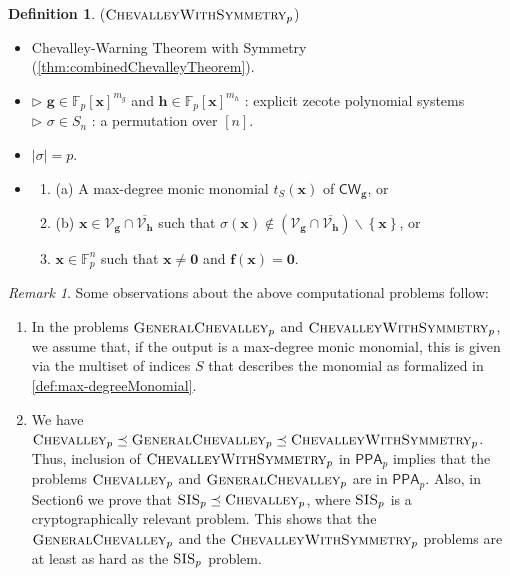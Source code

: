 \documentclass[10pt,a4paper]{article}
\theoremstyle{definition}
\newtheorem{definition}[theorem]{Definition}
\theoremstyle{remark}
\newtheorem{remark}[theorem]{Remark}
\newenvironment{Enumerate}{\begin{enumerate}}{\end{enumerate}}
\newcommand{\contour}[2]{#2}
\def\set#1{\left\{#1\right\}}
\newcommand{\bbF}{\ensuremath{\mathbb{F}}}
\newcommand{\calV}{\mathcal{V}}
\renewcommand{\vec}[1]{\boldsymbol{#1}}
\newcommand{\vecf}{\ensuremath{\boldsymbol{f}}}
\newcommand{\vecg}{\ensuremath{\boldsymbol{g}}}
\newcommand{\vech}{\ensuremath{\boldsymbol{h}}}
\newcommand{\vecx}{\ensuremath{\boldsymbol{x}}}
\newcommand{\problem}[1]{\ensuremath{\textsc{#1}}\xspace}
\newcommand{\class}[1]{\ensuremath{\mathsf{#1}}\xspace}
\newcommand{\PPA}{\class{PPA}}
\newcommand{\sis}{\problem{SIS}}
\newcommand{\pnum}{p}
\newcommand{\lChevalleyp}{\textsc{GeneralChevalley}_{\pnum}}
\newcommand{\cChevalleyp}{\textsc{ChevalleyWithSymmetry}_{\pnum}}
\newcommand{\eChevalleyp}{\textsc{Chevalley}_{\pnum}}
\newcommand{\CW}{\mathsf{CW}}
\begin{document}
	\noindent
	\begin{minipage}{\linewidth}
		\begin{definition}
			\label{def:combined-chevalley} \contour{black}{($\cChevalleyp$)}\vspace{-5pt}
			\begin{itemize}[leftmargin=2.15cm,itemsep=4pt]
				\item[\slshape Principle:] Chevalley-Warning Theorem with Symmetry (\autoref{thm:combinedChevalleyTheorem}).
				\item[\slshape Input:] $\triangleright$ $\vecg \in \bbF_p[\vecx]^{m_g}$ and $\vech \in \bbF_p[\vecx]^{m_h}$ : explicit zecote polynomial systems\\
 $\triangleright$ $\sigma \in S_n$ : a permutation over $[n]$.
				\item[\slshape Condition:] $|\sigma| = p$.
				\item[\slshape Output:] \begin{Enumerate}[leftmargin=*]
  \item[0.] (a) A max-degree monic monomial $t_S(\vecx)$ of $\CW_{\vecg}$, or
  \item[] (b) $\vecx \in \calV_{\vecg} \cap \overline{\calV_{\vech}}$ such that
        $\sigma(\vecx) \not\in (\calV_{\vecg} \cap \overline{\calV_{\vech}}) \smallsetminus \set{\vecx}$, or
  \item $\vecx \in \bbF_p^n$ such that $\vecx \neq \vec{0}$ and $\vecf(\vecx) = \vec{0}$.
\end{Enumerate}
			\end{itemize}
		\end{definition}
	\end{minipage}\vspace{3mm}


\begin{remark} \label{rem:computationalDefinitions}
    Some observations about the above computational problems follow:
  \begin{Enumerate}
    \item In the problems $\lChevalleyp$ and $\cChevalleyp$,  we assume that, if the output is a max-degree monic monomial, this is given via the multiset of indices $S$ that describes the monomial as formalized in \autoref{def:max-degreeMonomial}.
    \item We have $\eChevalleyp \preceq \lChevalleyp \preceq \cChevalleyp$. Thus, inclusion of $\cChevalleyp$ in $\PPA_p$ implies that the problems $\eChevalleyp$ and $\lChevalleyp$ are in $\PPA_p$. Also, in Section6 we prove that $\sis_p \preceq \eChevalleyp$, where $\sis_p$ is a cryptographically relevant problem. This shows that the $\lChevalleyp$ and the $\cChevalleyp$ problems are at least as hard as the $\sis_p$ problem.
  \end{Enumerate}
\end{remark}
\end{document}
